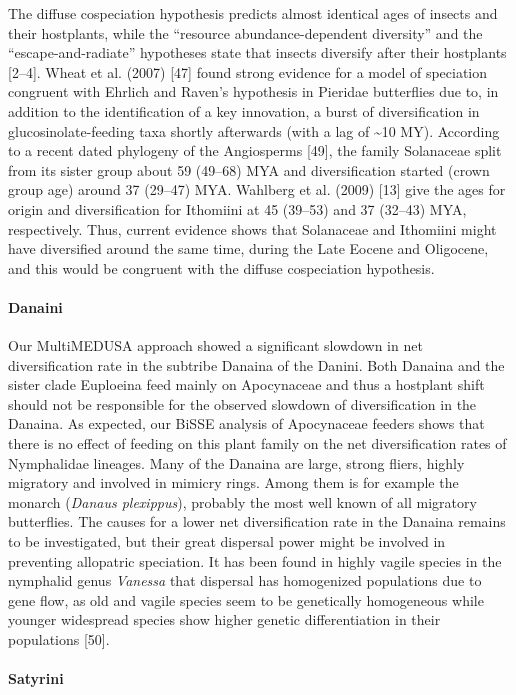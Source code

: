 \documentclass[10pt]{article}
\begin{document}
The diffuse cospeciation hypothesis predicts almost identical ages of
insects and their hostplants, while the ``resource abundance-dependent
diversity'' and the ``escape-and-radiate'' hypotheses state that insects
diversify after their hostplants {[}2--4{]}. Wheat et al. (2007)
{[}47{]} found strong evidence for a model of speciation congruent with
Ehrlich and Raven's hypothesis in Pieridae butterflies due to, in
addition to the identification of a key innovation, a burst of
diversification in glucosinolate-feeding taxa shortly afterwards (with a
lag of \textasciitilde{}10 MY). According to a recent dated phylogeny of
the Angiosperms {[}49{]}, the family Solanaceae split from its sister
group about 59 (49--68) MYA and diversification started (crown group
age) around 37 (29--47) MYA. Wahlberg et al. (2009) {[}13{]} give the
ages for origin and diversification for Ithomiini at 45 (39--53) and 37
(32--43) MYA, respectively. Thus, current evidence shows that Solanaceae
and Ithomiini might have diversified around the same time, during the
Late Eocene and Oligocene, and this would be congruent with the diffuse
cospeciation hypothesis.

\paragraph*{Danaini}
Our MultiMEDUSA approach showed a significant slowdown in net
diversification rate in the subtribe Danaina of the Danini. Both Danaina
and the sister clade Euploeina feed mainly on Apocynaceae and thus a
hostplant shift should not be responsible for the observed slowdown of
diversification in the Danaina. As expected, our BiSSE analysis of
Apocynaceae feeders shows that there is no effect of feeding on this
plant family on the net diversification rates of Nymphalidae lineages.
Many of the Danaina are large, strong fliers, highly migratory and
involved in mimicry rings. Among them is for example the monarch
(\emph{Danaus plexippus}), probably the most well known of all migratory
butterflies. The causes for a lower net diversification rate in the
Danaina remains to be investigated, but their great dispersal power
might be involved in preventing allopatric speciation. It has been found
in highly vagile species in the nymphalid genus \emph{Vanessa} that
dispersal has homogenized populations due to gene flow, as old and
vagile species seem to be genetically homogeneous while younger
widespread species show higher genetic differentiation in their
populations {[}50{]}.

\paragraph*{Satyrini}
\end{document}

